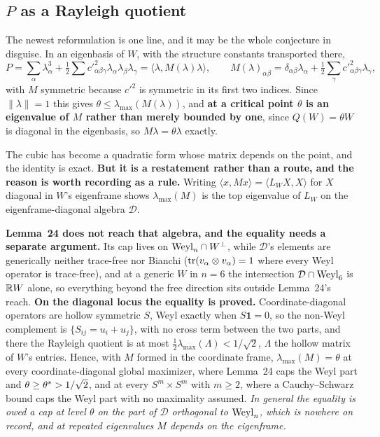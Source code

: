 \subsection{$P$ as a Rayleigh quotient}\label{sec:rayleigh}

The newest reformulation is one line, and it may be the whole conjecture in disguise. In an eigenbasis of $W$, with the structure constants transported there,
\[
P=\sum_\alpha\lambda_\alpha^3+\tfrac12\sum c'^2_{\alpha\beta\gamma}\lambda_\alpha\lambda_\beta\lambda_\gamma=\big\langle\lambda,M(\lambda)\lambda\big\rangle,
\qquad
M(\lambda)_{\alpha\beta}=\delta_{\alpha\beta}\lambda_\alpha+\tfrac12\sum_\gamma c'^2_{\alpha\beta\gamma}\lambda_\gamma ,
\]
with $M$ symmetric because $c'^2$ is symmetric in its first two indices. Since $\|\lambda\|=1$ this gives $\theta\le\lambda_{\max}(M(\lambda))$, and \textbf{at a critical point $\theta$ is an eigenvalue of $M$ rather than merely bounded by one}, since $Q(W)=\theta W$ is diagonal in the eigenbasis, so $M\lambda=\theta\lambda$ exactly.

The cubic has become a quadratic form whose matrix depends on the point, and the identity is exact. \textbf{But it is a restatement rather than a route, and the reason is worth recording as a rule.} Writing $\langle x,Mx\rangle=\langle L_WX,X\rangle$ for $X$ diagonal in $W$'s eigenframe shows $\lambda_{\max}(M)$ is the top eigenvalue of $L_W$ on the eigenframe-diagonal algebra $\mathcal D$.

\textbf{Lemma~24 does not reach that algebra, and the equality needs a separate argument.} Its cap lives on $\mathrm{Weyl}_n\cap W^\perp$, while $\mathcal D$'s elements are generically neither trace-free nor Bianchi ($\operatorname{tr}(v_\alpha\otimes v_\alpha)=1$ where every Weyl operator is trace-free), and at a generic $W$ in $n=6$ the intersection $\mathcal D\cap\mathrm{Weyl}_6$ is $\mathbb{R} W$ alone, so everything beyond the free direction sits outside Lemma~24's reach. \textbf{On the diagonal locus the equality is proved.} Coordinate-diagonal operators are hollow symmetric $S$, Weyl exactly when $S\mathbf 1=0$, so the non-Weyl complement is $\{S_{ij}=u_i+u_j\}$, with no cross term between the two parts, and there the Rayleigh quotient is at most $\tfrac12\lambda_{\max}(\Lambda)<1/\sqrt2$, $\Lambda$ the hollow matrix of $W$'s entries. Hence, with $M$ formed in the coordinate frame, $\lambda_{\max}(M)=\theta$ at every coordinate-diagonal global maximizer, where Lemma~24 caps the Weyl part and $\theta\ge\theta^{*}>1/\sqrt2$, and at every $S^m\times S^m$ with $m\ge2$, where a Cauchy--Schwarz bound caps the Weyl part with no maximality assumed. \emph{In general the equality is owed a cap at level $\theta$ on the part of $\mathcal D$ orthogonal to $\mathrm{Weyl}_n$, which is nowhere on record, and at repeated eigenvalues $M$ depends on the eigenframe.}

